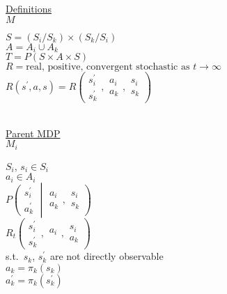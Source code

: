 \underline{Definitions}\\

\underline{$M$}\quad
\begin{minipage}[t]{5in}
$S=(S_i/S_k)\times(S_k/S_i)$\\
$A=A_i\cup A_k$\\
$T=P(S\times A\times S)$\\
$R= \text{real, positive, convergent stochastic as $t\to\infty$}$\\
$R(s^\prime,a,s) =R\left( 
\begin{array}{c} s^\prime_i \\ s^\prime_k \end{array},
\begin{array}{c} a_i \\ a_k \end{array},
\begin{array}{c} s_i \\ s_k \end{array}
\right)$
\end{minipage}\\

\underline{Parent MDP}\\


\underline{$M_i$}\quad
\begin{minipage}[t]{5in}
$S_i $, $s_i\in S_i$\\
$a_i\in A_i$\\
$P\left(
\begin{array}{c} s^\prime_i \\ a^\prime_k \end{array}
\middle|
\begin{array}{c}a_i \\ a_k \end{array},
\begin{array}{c} s_i \\ s_k \end{array}
\right)$\\
$R_t\left( 
\begin{array}{c} s^\prime_i \\ s^\prime_k \end{array},
\begin{array}{c} a_i \\ \end{array},
\begin{array}{c} s_i \\ a_k \end{array}
\right)$ \\
s.t.\ $s_k$, $s^\prime_k$ are not directly observable\\
$a_k=\pi_k(s_k)$\\
$a^\prime_k=\pi_k(s^\prime_k)$
\end{minipage}\\



